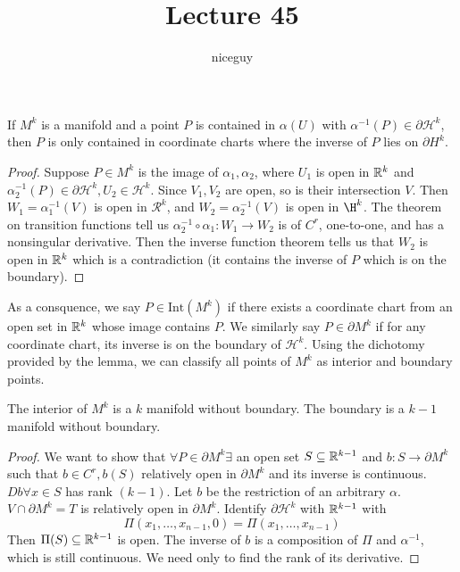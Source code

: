 \documentclass[12pt]{article}
\title{Lecture 45}
\author{niceguy}
\begin{document}
\maketitle

\begin{lem}
    If $M^k$ is a manifold and a point $P$ is contained in $\alpha(U)$ with $\alpha^{-1}(P) \in \partial\mathcal H^k$, then $P$ is only contained in coordinate charts where the inverse of $P$ lies on $\partial H^k$.
\end{lem}

\begin{proof}
    Suppose $P \in M^k$ is the image of $\alpha_1, \alpha_2$, where $U_1$ is open in $\mathbb{R}^k$ and $\alpha_2^{-1}(P) \in \partial \mathcal H^k, U_2 \in \mathcal H^k$. Since $V_1, V_2$ are open, so is their intersection $V$. Then $W_1 = \alpha_1^{-1}(V)$ is open in $\mathcal R^k$, and $W_2 = \alpha^{-1}_2(V)$ is open in $\H^k$. The theorem on transition functions tell us $\alpha^{-1}_2 \circ \alpha_1: W_1 \rightarrow W_2$ is of $C^r$, one-to-one, and has a nonsingular derivative. Then the inverse function theorem tells us that $W_2$ is open in $\mathbb{R}^k$ which is a contradiction (it contains the inverse of $P$ which is on the boundary).
\end{proof}

As a consquence, we say $P \in \text{Int}(M^k)$ if there exists a coordinate chart from an open set in $\mathbb{R}^k$ whose image contains $P$. We similarly say $P \in \partial M^k$ if for any coordinate chart, its inverse is on the boundary of $\mathcal H^k$. Using the dichotomy provided by the lemma, we can classify all points of $M^k$ as interior and boundary points.

\begin{prop}
    The interior of $M^k$ is a $k$ manifold without boundary. The boundary is a $k-1$ manifold without boundary.
\end{prop}

\begin{proof}
    We want to show that $\forall P \in \partial M^k \exists$ an open set $S \subseteq \mathbb{R}^{k-1}$ and $b: S \rightarrow \partial M^k$ such that $b \in C^r, b(S)$ relatively open in $\partial M^k$ and its inverse is continuous. $Db \forall x \in S$ has rank $(k-1)$. Let $b$ be the restriction of an arbitrary $\alpha$. $V \cap \partial M^k = T$ is relatively open in $\partial M^k$. Identify $\partial \mathcal H^k$ with $\mathbb{R}^{k-1}$ with 
    $$\Pi(x_1,\dots,x_{n-1},0) = \Pi(x_1,\dots,x_{n-1})$$
    Then $\Pi(S) \subseteq \mathbb{R}^{k-1}$ is open. The inverse of $b$ is a composition of $\Pi$ and $\alpha^{-1}$, which is still continuous. We need only to find the rank of its derivative.
\end{proof}
\end{document}
